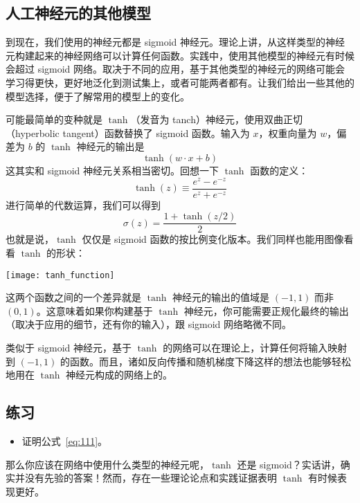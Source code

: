 \subsection{人工神经元的其他模型}

到现在，我们使用的神经元都是 sigmoid 神经元。理论上讲，从这样类型的神经元构建起来的神经网络可以计算任何函数。实践中，使用其他模型的神经元有时候会超过 sigmoid 网络。取决于不同的应用，基于其他类型的神经元的网络可能会学习得更快，更好地泛化到测试集上，或者可能两者都有。让我们给出一些其他的模型选择，便于了解常用的模型上的变化。

可能最简单的变种就是 $\tanh$（发音为 tanch）神经元，使用双曲正切（hyperbolic tangent）函数替换了 sigmoid 函数。输入为 $x$，权重向量为 $w$，偏差为 $b$ 的 $\tanh$ 神经元的输出是
\begin{equation}
  \tanh(w \cdot x+b)
  \label{eq:109}\tag{109}
\end{equation}
这其实和 sigmoid 神经元关系相当密切。回想一下 $\tanh$ 函数的定义：
\begin{equation}
  \tanh(z) \equiv \frac{e^z-e^{-z}}{e^z+e^{-z}}
  \label{eq:110}\tag{110}
\end{equation}
进行简单的代数运算，我们可以得到
\begin{equation} 
  \sigma(z) = \frac{1+\tanh(z/2)}{2}
  \label{eq:111}\tag{111}
\end{equation}
也就是说，$\tanh$ 仅仅是 sigmoid 函数的按比例变化版本。我们同样也能用图像看看 $\tanh$ 的形状：
\begin{center}
  \texttt{[image: tanh\_function]}
\end{center}

这两个函数之间的一个差异就是 $\tanh$ 神经元的输出的值域是 $(-1, 1)$ 而非 $(0, 1)$。这意味着如果你构建基于 $\tanh$ 神经元，你可能需要正规化最终的输出（取决于应用的细节，还有你的输入），跟 sigmoid 网络略微不同。

类似于 sigmoid 神经元，基于 $\tanh$ 的网络可以在理论上，计算任何将输入映射到 $(-1, 1)$ 的函数。而且，诸如反向传播和随机梯度下降这样的想法也能够轻松地用在 $\tanh$ 神经元构成的网络上的。

\subsection*{练习}

\begin{itemize}
\item 证明公式~\eqref{eq:111}。
\end{itemize}

那么你应该在网络中使用什么类型的神经元呢，$\tanh$ 还是 sigmoid？实话讲，确实并没有先验的答案！然而，存在一些理论论点和实践证据表明 $\tanh$ 有时候表现更好。

